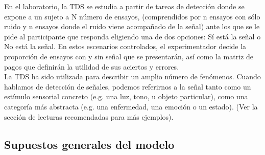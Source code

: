 En el laboratorio, la  TDS se estudia a partir  de tareas de detección donde se expone a un  sujeto  a  N  número  de  ensayos,  (comprendidos  por  n  ensayos con  sólo  ruido  y  n  ensayos donde  el  ruido  viene  acompañado  de  la  señal)  ante  los  que  se  le  pide  al  participante  que responda eligiendo una de dos opciones: Sí está la señal o No está la señal. En estos escenarios controlados,  el  experimentador  decide  la  proporción  de  ensayos  con  y  sin  señal  que  se presentarán, así como la matriz de pagos que definirán la utilidad de sus aciertos y errores. \\

La TDS ha sido utilizada para describir un amplio número de fenómenos. Cuando hablamos de detección de señales, podemos referirnos a la señal tanto como un estímulo sensorial concreto (e.g. una luz, tono, u objeto particular), como una categoría más abstracta (e.g. una enfermedad, una emoción o un estado).  (Ver la sección de lecturas recomendadas para más ejemplos).\\


\subsection{Supuestos generales del modelo}

